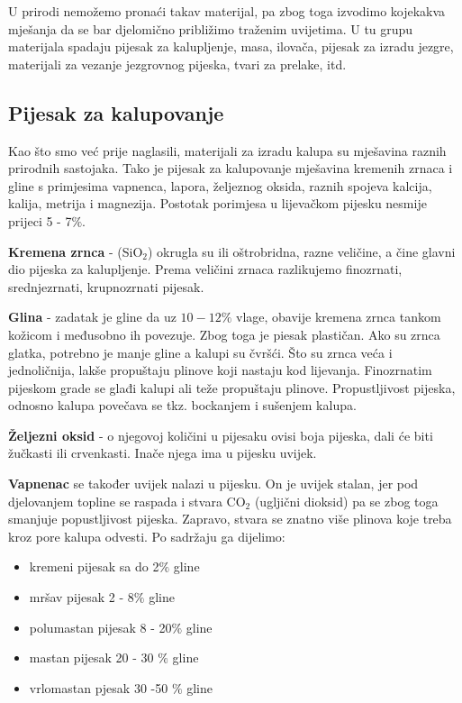 \documentclass[a4paper,12pt]{article}
\numberwithin{figure}{section}
\begin{document}
U prirodi nemožemo pronaći takav materijal, pa zbog toga izvodimo kojekakva mješanja da se bar djelomično približimo traženim uvijetima. U tu grupu materijala spadaju pijesak za kalupljenje, masa, ilovača, pijesak za izradu jezgre, materijali za vezanje jezgrovnog pijeska, tvari za prelake, itd.
\subsection{Pijesak za kalupovanje}
Kao što smo već prije naglasili, materijali za izradu kalupa su mješavina raznih prirodnih sastojaka. Tako je pijesak za kalupovanje mješavina kremenih zrnaca i gline s primjesima vapnenca, lapora, željeznog oksida, raznih spojeva kalcija, kalija, metrija i magnezija. Postotak porimjesa u lijevačkom pijesku nesmije prijeci 5 - 7$\%$.\par
\textbf{Kremena zrnca} - (SiO$_{2}$) okrugla su ili oštrobridna, razne veličine, a čine glavni dio pijeska za kalupljenje. Prema veličini zrnaca razlikujemo finozrnati, srednjezrnati, krupnozrnati pijesak.\par
\textbf{Glina} - zadatak je gline da uz $10 - 12\%$ vlage, obavije kremena zrnca tankom kožicom i međusobno ih povezuje. Zbog toga je piesak plastičan. Ako su zrnca glatka, potrebno je manje gline a kalupi su čvršći. Što su zrnca veća i jednoličnija, lakše propuštaju plinove koji nastaju kod lijevanja. Finozrnatim pijeskom grade se glađi kalupi ali teže propuštaju plinove. Propustljivost pijeska, odnosno kalupa povečava se tkz. bockanjem i sušenjem kalupa.\par
\textbf{Željezni oksid} - o njegovoj količini u pijesaku ovisi boja pijeska, dali će biti žučkasti ili crvenkasti. Inače njega ima u pijesku uvijek. \par 
\textbf{Vapnenac} se također uvijek nalazi u pijesku. On je uvijek stalan, jer pod djelovanjem topline se raspada i stvara CO$_{2}$ (ugljični dioksid) pa se zbog toga smanjuje popustljivost pijeska. Zapravo, stvara se znatno više plinova koje treba kroz pore kalupa odvesti. Po sadržaju ga dijelimo:
\begin{itemize}
\item kremeni pijesak sa do 2$\%$ gline
\item mršav pijesak 2 - 8$\%$ gline
\item polumastan pijesak 8 - 20$\%$ gline
\item mastan pijesak 20 - 30 $\%$ gline
\item vrlomastan pjesak 30 -50 $\%$ gline
\end{itemize}
\end{document}
